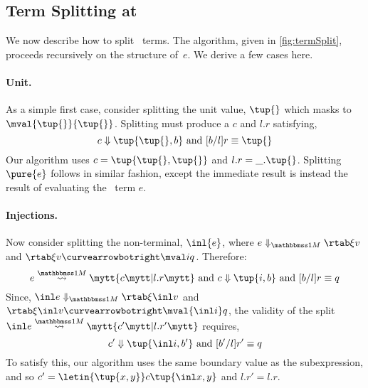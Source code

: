 \begin{abstrsyn}



\subsection{Term Splitting at \bbonem}
\label{sec:split-one}

We now describe how to split \bbonem\ terms. The algorithm, given in
\cref{fig:termSplit}, proceeds recursively on the structure of~$e$. We
derive a few cases here.

\paragraph {Unit.} 
As a simple first case, consider splitting the unit value, $\tup{}$
which masks to $\mval {\tup{}} {\tup{}}$.
Splitting must produce a $c$ and $l.r$ satisfying,
\[
	\reduce c {\tup{\tup{},b}} \text{ and } [b/l]r \equiv \tup{}
\]
Our algorithm uses $c=\tup{\tup{},\tup{}}$ and $l.r = \_.\tup{}$.
Splitting $\pure{e}$ follows in similar fashion, except the immediate
result is instead the result of evaluating the \bbonep\ term $e$.

\paragraph {Injections.}
Now consider splitting the non-terminal, $\inl {e}$, where $\diaone
{e} \xi v$ and $\rtab \xi v \vsplito \mval i q$. Therefore:
\[
	\splitone e A c {l.r} \text{ and } \reduce c {\tup{i,b}} \text{ and } [b/l]r \equiv q
\]
Since, $\diaone {\inl e} \xi {\inl v}$ and $\rtab \xi {\inl v} \vsplito \mval {\inl i} q$,
the validity of the split $\splitone {\inl e} A {c'} {l.r'}$ requires,
\[
	\reduce {c'} {\tup{\inl i,b'}} \text{ and } [b'/l]r' \equiv q
\]
To satisfy this, our algorithm uses the same boundary value as the subexpression,
and so $c' = \letin {\tup {x,y}} c {\tup{\inl x, y}}$ and $l.r' = l.r$.


\end{abstrsyn}
